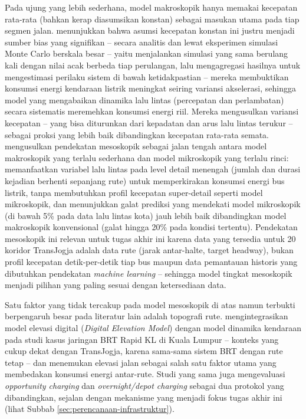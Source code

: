 Pada ujung yang lebih sederhana, model makroskopik hanya memakai kecepatan
rata-rata (bahkan kerap diasumsikan konstan) sebagai masukan utama pada
tiap segmen jalan. \textcite{montanino2025} menunjukkan bahwa
asumsi kecepatan konstan ini justru menjadi sumber bias yang signifikan --
secara analitis dan lewat eksperimen simulasi Monte Carlo berskala besar
-- yaitu menjalankan simulasi yang sama berulang kali dengan nilai acak
berbeda tiap perulangan, lalu mengagregasi hasilnya untuk mengestimasi
perilaku sistem di bawah ketidakpastian \autocite{law2015} --
mereka membuktikan konsumsi energi kendaraan listrik meningkat seiring
variansi akselerasi, sehingga model yang mengabaikan dinamika lalu lintas
(percepatan dan perlambatan) secara sistematis meremehkan konsumsi energi
riil. Mereka mengusulkan variansi kecepatan -- yang bisa diturunkan dari
kepadatan dan arus lalu lintas terukur -- sebagai proksi yang lebih baik
dibandingkan kecepatan rata-rata semata. \textcite{mamarikas2025}
mengusulkan pendekatan mesoskopik sebagai jalan
tengah antara model makroskopik yang terlalu sederhana dan model
mikroskopik yang terlalu rinci: memanfaatkan variabel lalu lintas pada
level detail menengah (jumlah dan durasi kejadian berhenti sepanjang rute)
untuk memperkirakan konsumsi energi bus listrik, tanpa membutuhkan profil
kecepatan super-detail seperti model mikroskopik, dan menunjukkan galat
prediksi yang mendekati model mikroskopik (di bawah 5\% pada data lalu
lintas kota) jauh lebih baik dibandingkan model makroskopik konvensional
(galat hingga 20\% pada kondisi tertentu). Pendekatan mesoskopik ini relevan
untuk tugas akhir ini karena data yang tersedia untuk 20 koridor TransJogja
adalah data rute (jarak antar-halte, target headway), bukan profil
kecepatan detik-per-detik tiap bus maupun data pemantauan historis yang
dibutuhkan pendekatan \textit{machine learning} -- sehingga model tingkat
mesoskopik menjadi pilihan yang paling sesuai dengan ketersediaan data.

Satu faktor yang tidak tercakup pada model mesoskopik di atas namun terbukti
berpengaruh besar pada literatur lain adalah topografi rute. \textcite{alogaili2020} mengintegrasikan model elevasi digital (\textit{Digital
	Elevation Model}) dengan model dinamika kendaraan pada studi kasus jaringan
BRT Rapid KL di Kuala Lumpur -- konteks yang cukup dekat dengan TransJogja,
karena sama-sama sistem BRT dengan rute tetap -- dan menemukan elevasi jalan
sebagai salah satu faktor utama yang membedakan konsumsi energi antar-rute.
Studi yang sama juga mengevaluasi \textit{opportunity charging} dan
\textit{overnight/depot charging} sebagai dua protokol yang dibandingkan,
sejalan dengan mekanisme yang menjadi fokus tugas akhir ini (lihat Subbab
\ref{sec:perencanaan-infrastruktur}).

